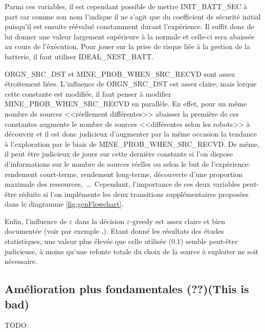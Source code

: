 Parmi ces variables, il est cependant possible de mettre {\ttfamily INIT\_BATT\_SEC} à part car comme son nom l'indique il ne s'agit que du coefficient de sécurité initial puisqu'il est ensuite réévalué constamment durant l'expérience. Il suffit donc de lui donner une valeur largement supérieure à la normale et celle-ci sera abaissée au cours de l'éxécution. Pour jouer sur la prise de risque liée à la gestion de la batterie, il faut utiliser {\ttfamily IDEAL\_NEST\_BATT}.

{\ttfamily ORGN\_SRC\_DST} et {\ttfamily MINE\_PROB\_WHEN\_SRC\_RECVD} sont assez étroitement liées. L'influence de {\ttfamily ORGN\_SRC\_DST} est assez claire, mais lorque cette constante est modifiée, il faut penser à modifier {\ttfamily MINE\_PROB\_WHEN\_SRC\_RECVD} en parallèle. En effet, pour un même nombre de sources <<réellement différentes>> abaisser la première de ces constantes augmente le nombre de sources <<différentes selon les robots>> à découvrir et il est donc judicieux d'augmenter par la même occasion la tendance à l'exploration par le biais de {\ttfamily MINE\_PROB\_WHEN\_SRC\_RECVD}. De même, il peut être judicieux de jouer sur cette dernière constante si l'on dispose d'informations sur le nombre de sources réelles ou selon le but de l'expérience: rendement court-terme, rendement long-terme, découverte d'une proportion maximale des ressources,~\ldots\ Cependant, l'importance de ces deux variables peut-être réduite si l'on implémente les deux transitions supplémentaires proposées dans le diagramme \ref{fig:genFlowchart}.

Enfin, l'influence de $\varepsilon$ dans la décision $\varepsilon$-greedy est assez claire et bien documentée (voir par exemple \cite{foraging}.). Etant donné les résultats des études statistiques, une valeur plus élevée que celle utilisée ($0.1$) semble peut-être judicieuse, à moins qu'une refonte totale du choix de la source à exploiter ne soit nécessaire.

\subsection{Amélioration plus fondamentales (??)(This is bad)}

TODO

